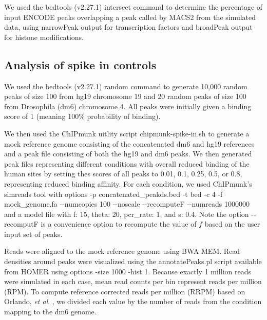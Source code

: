 \documentclass[12pt]{article}
\begin{document}
We used the bedtools \cite{bedtools} (v2.27.1) intersect command to determine the percentage of input ENCODE peaks overlapping a peak called by MACS2 from the simulated data, using narrowPeak output for transcription factors and broadPeak output for histone modifications.

\subsection*{Analysis of spike in controls}
We used the bedtools \cite{bedtools} (v2.27.1) random command to generate 10,000 random peaks of size 100 from hg19 chromosome 19 and 20 random peaks of size 100 from Drosophila (dm6) chromosome 4. All peaks were initially given a binding score of 1 (meaning 100\% probability of binding).

We then used the ChIPmunk uitlity script chipmunk-spike-in.sh to generate a mock reference genome consisting of the concatenated dm6 and hg19 references and a peak file consisting of both the hg19 and dm6 peaks. We then generated peak files representing different conditions with overall reduced binding of the human sites by setting thes scores of all peaks to 0.01, 0.1, 0.25, 0.5, or 0.8, representing reduced binding affinity.
For each condition, we used ChIPmunk's simreads tool with options -p concatenated\_peakds.bed -t bed -c 4 -f mock\_genome.fa -{}-numcopies 100 -{}-noscale -{}-recomputeF -{}-numreads 1000000 and a model file with f: 15, theta: 20, pcr\_rate: 1, and s: 0.4. Note the option -{}-recomputF is a convenience option to recompute the value of $f$ based on the user input set of peaks.

Reads were aligned to the mock reference genome using BWA MEM. Read densities around peaks were visualized using the annotatePeaks.pl script available from HOMER \cite{HOMER} using options -size 1000 -hist 1.
Because exactly 1 million reads were simulated in each case, mean read counts per bin represent reads per million (RPM).
To compute reference corrected reads per million (RRPM) based on Orlando, \emph{et al}. \cite{spikein}, we divided each value by the number of reads from the condition mapping to the dm6 genome.



\end{document}
